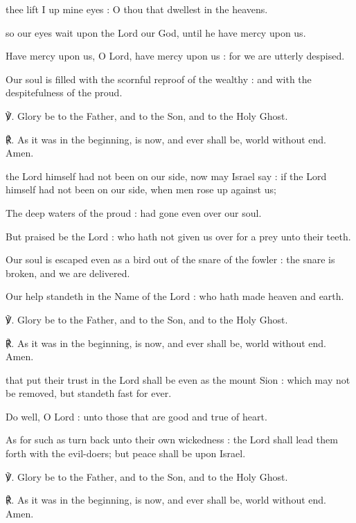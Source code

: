  thee lift I up mine eyes : O thou that dwellest in the heavens.\par
{}
\noindent
so our eyes wait upon the Lord our God, until he have mercy upon us.\par
{}Have mercy upon us, O Lord, have mercy upon us : for we are utterly despised.\par
{}Our soul is filled with the scornful reproof of the wealthy : and with the despitefulness of the proud.\par
℣. Glory be to the Father, and to the Son, and to the Holy Ghost.\par
℟. As it was in the beginning, is now, and ever shall be, world without end. Amen.

 the Lord himself had not been on our side, now may Israel say : if the Lord himself had not been on our side, when men rose up against us;\par
{}
The deep waters of the proud : had gone even over our soul.\par
{}But praised be the Lord : who hath not given us over for a prey unto their teeth.\par
{}Our soul is escaped even as a bird out of the snare of the fowler : the snare is broken, and we are delivered.\par
{}Our help standeth in the Name of the Lord : who hath made heaven and earth.\par
℣. Glory be to the Father, and to the Son, and to the Holy Ghost.\par
℟. As it was in the beginning, is now, and ever shall be, world without end. Amen.

 that put their trust in the Lord shall be even as the mount Sion : which may not be removed, but standeth fast for ever.\par
{}
Do well, O Lord : unto those that are good and true of heart.\par
{}As for such as turn back unto their own wickedness : the Lord shall lead them forth with the evil-doers; but peace shall be upon Israel.\par
℣. Glory be to the Father, and to the Son, and to the Holy Ghost.\par
℟. As it was in the beginning, is now, and ever shall be, world without end. Amen.

